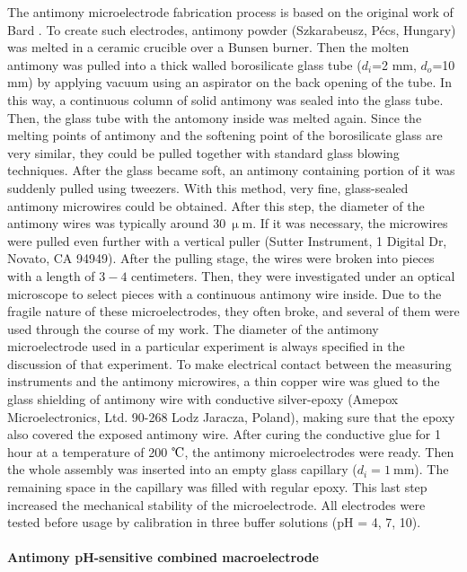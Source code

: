The antimony microelectrode fabrication process is based on the original work of Bard \cite{horrocks1993scanning}.
To create such electrodes, antimony powder (Szka\-ra\-be\-usz, Pécs, Hungary) was melted in a ceramic crucible over a Bunsen burner. Then the molten antimony was pulled into a thick walled borosilicate glass tube ($d_i$=2 mm, $d_o$=10 mm) by applying vacuum using an aspirator on the back opening of the tube.
In this way, a continuous column of solid antimony was sealed into the glass tube.
Then, the glass tube with the antomony inside was melted again.
Since the melting points of antimony and the softening point of the borosilicate glass are very similar, they could be pulled together with standard glass blowing techniques.
After the glass became soft, an antimony containing portion of it was suddenly pulled using tweezers.
With this method, very fine, glass-sealed antimony microwires could be obtained.
After this step, the diameter of the antimony wires was typically around $30~\upmu$m.
If it was necessary, the microwires were pulled even further with a vertical puller (Sutter Instrument, 1 Digital Dr, Novato, CA 94949).
After the pulling stage, the wires were broken into pieces with a length of $3-4$ centimeters.
Then, they were investigated under an optical microscope to select pieces with a continuous antimony wire inside.
Due to the fragile nature of these microelectrodes, they often broke, and several of them were used through the course of my work.
The diameter of the antimony microelectrode used in a particular experiment is always specified in the discussion of that experiment.
To make electrical contact between the measuring instruments and the antimony microwires, a thin copper wire was glued to the glass shielding of antimony wire with conductive silver-epoxy (Amepox Microelectronics, Ltd.
90-268 Lodz Jaracza, Poland), making sure that the epoxy also covered the exposed antimony wire.
After curing the conductive glue for 1 hour at a temperature of 200 $\celsius$, the antimony microelectrodes were ready.
Then the whole assembly was inserted into an empty glass capillary ($d_i=1~$mm).
The remaining space in the capillary was filled with regular epoxy.
This last step increased the mechanical stability of the microelectrode.
All electrodes were tested before usage by calibration in three buffer solutions (pH = 4, 7, 10). 

\paragraph{Antimony pH-sensitive combined macroelectrode}

